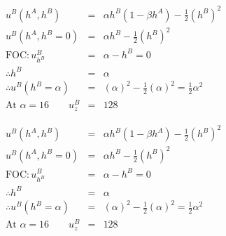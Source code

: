 \begin{eqnarray}
u^B(h^A, h^B) & = & \alpha h^B(1 - \beta h^A) - \frac{1}{2}(h^B)^2 \nonumber \\
u^B(h^A, h^B = 0 ) & = & \alpha h^B - \frac{1}{2}(h^B)^2 \nonumber \\
\mbox{FOC}: u^B_{h^B} & = & \alpha - h^B = 0 \nonumber \\
\therefore h^B &=& \alpha \nonumber \\ 
\therefore u^B(h^B = \alpha) &= & (\alpha)^2 - \frac{1}{2}(\alpha)^2 = \frac{1}{2}\alpha^2 \nonumber \\
\mbox{At } \alpha = 16 \qquad u^B_z &=& 128 \nonumber 
\end{eqnarray}


\begin{eqnarray}
u^B(h^A, h^B) & = & \alpha h^B(1 - \beta h^A) - \frac{1}{2}(h^B)^2 \nonumber \\
u^B(h^A, h^B = 0 ) & = & \alpha h^B - \frac{1}{2}(h^B)^2 \nonumber \\
\mbox{FOC}: u^B_{h^B} & = & \alpha - h^B = 0 \nonumber \\
\therefore h^B &=& \alpha \nonumber \\ 
\therefore u^B(h^B = \alpha) &= & (\alpha)^2 - \frac{1}{2}(\alpha)^2 = \frac{1}{2}\alpha^2 \nonumber \\
\mbox{At } \alpha = 16 \qquad u^B_z &=& 128 \nonumber 
\end{eqnarray}


